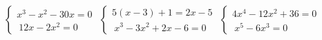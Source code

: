 \begin{homework}[number=3]
\begin{listofex}
\begin{tasks}
\begin{cases}
			\end{cases} \)
			\task \( \begin{cases}
				x^{3}-x^{2}-30x=0\\\ 12x-2x^{2}=0
			\end{cases} \)
			\task \( \begin{cases}
				5(x-3)+1=2x-5\\\ x^{3}-3x^{2}+2x -6=0
			\end{cases} \)
			\task \( \begin{cases}
				4x^{4}-12x^{2}+36=0\\\ x^{5}-6x^{3}=0
			\end{cases} \)
		\end{tasks}
	\end{listofex}
\end{homework}

